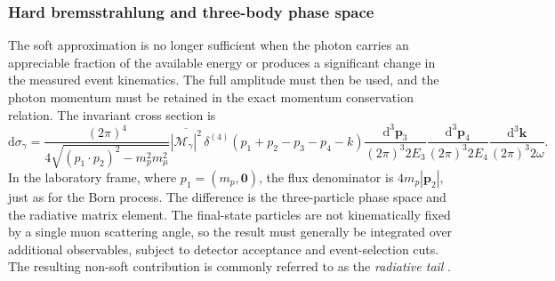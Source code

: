 \subsubsection{Hard bremsstrahlung and three-body phase space}

The soft approximation is no longer sufficient when the photon carries an
appreciable fraction of the available energy or produces a significant
change in the measured event kinematics. The full amplitude must then be
used, and the photon momentum must be retained in the exact momentum
conservation relation. The invariant cross section is
\begin{equation}
 \mathrm d\sigma_{\gamma}
 =\frac{(2\pi)^4}{4\sqrt{(p_1\cdot p_2)^2-m_p^2m_\mu^2}}
 \overline{|\mathcal M_{\gamma}|^2}\,
 \delta^{(4)}(p_1+p_2-p_3-p_4-k)
 \frac{\mathrm d^3\boldsymbol p_3}{(2\pi)^3 2E_3}
 \frac{\mathrm d^3\boldsymbol p_4}{(2\pi)^3 2E_4}
 \frac{\mathrm d^3\boldsymbol k}{(2\pi)^3 2\omega}.
 \label{eq:nlo_exact_three_body_xsec}
\end{equation}
In the laboratory frame, where $p_1=(m_p,\boldsymbol0)$,
the flux denominator is $4m_p|\boldsymbol p_2|$, just as for the Born
process. The difference is the three-particle phase space and the radiative
matrix element. The final-state particles are not kinematically fixed by a
single muon scattering angle, so the result must generally be integrated over
additional observables, subject to detector acceptance and event-selection
cuts. The resulting non-soft contribution is commonly referred to as the
\emph{radiative tail} \cite{Vanderhaeghen2000}.

